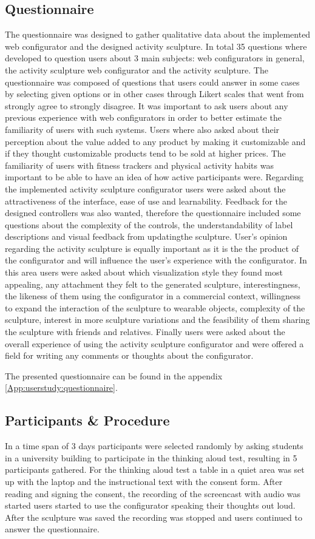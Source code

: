 \documentclass[../medieninformatik-arbeit.tex]{subfiles}
\begin{document}
\subsection{Questionnaire}
The questionnaire was designed to gather qualitative data about the implemented web configurator and the designed activity sculpture. In total 35 questions where developed to question users about 3 main subjects: web configurators in general, the activity sculpture web configurator and the activity sculpture. The questionnaire was composed of questions that users could answer in some cases by selecting given options or in other cases through Likert scales that went from strongly agree to strongly disagree. It was important to ask users about any previous experience with web configurators in order to better estimate the familiarity of users with such systems. Users where also asked about their perception about the value added to any product by making it customizable and if they thought customizable products tend to be sold at higher prices. The familiarity of users with fitness trackers and physical activity habits was important to be able to have an idea of how active participants were. Regarding the implemented activity sculpture configurator users were asked about the attractiveness of the interface, ease of use and learnability. Feedback for the designed controllers was also wanted, therefore the questionnaire included some questions about the complexity of the controls, the understandability of label descriptions and visual feedback from updatingthe sculpture. User's opinion regarding the activity sculpture is equally important as it is the the product of the configurator and will influence the user's experience with the configurator. In this area users were asked about which visualization style they found most appealing, any attachment they felt to the generated sculpture, interestingness, the likeness of them using the configurator in a commercial context, willingness to expand the interaction of the sculpture to wearable objects, complexity of the sculpture, interest in more sculpture variations  and the feasibility of them sharing the sculpture with friends and relatives.
Finally users were asked about the overall experience of using the activity sculpture configurator and were offered a field for writing any comments or thoughts about the configurator. 

The presented questionnaire can be found in the appendix \ref{App:userstudy:questionnaire}.

\subsection{Participants \& Procedure}
In a time span of 3 days participants were selected randomly by asking students in a university building to participate in the thinking aloud test, resulting in 5 participants gathered. For the thinking aloud test a table in a quiet area was set up with the laptop and the instructional text with the consent form. After reading and signing the consent, the recording of the screencast with audio was started  users started to use the configurator speaking their thoughts out loud. After the sculpture was saved the recording was stopped and users continued to answer the questionnaire. 
\end{document}
